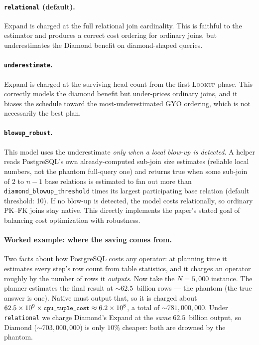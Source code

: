\documentclass[10pt,twocolumn]{article}
\newcommand{\lookup}{\textsc{Lookup}}
\newcommand{\code}[1]{{\small\texttt{#1}}}
\begin{document}
\paragraph{\code{relational} (default).}
Expand is charged at the full relational join cardinality. This is faithful
to the estimator and produces a correct cost ordering for ordinary joins, but
underestimates the Diamond benefit on diamond-shaped queries.

\paragraph{\code{underestimate}.}
Expand is charged at the surviving-head count from the first \lookup{} phase.
This correctly models the diamond benefit but under-prices ordinary joins, and
it biases the schedule toward the most-underestimated GYO ordering, which is
not necessarily the best plan.

\paragraph{\code{blowup\_robust}.}
This model uses the underestimate \emph{only when a local blow-up is
detected}. A helper reads PostgreSQL's own already-computed sub-join size
estimates (reliable local numbers, not the phantom full-query one) and
returns true when some sub-join of
2 to $n{-}1$ base relations is estimated to fan out more than
\code{diamond\_blowup\_threshold} times its largest participating base
relation (default threshold: 10). If no blow-up is detected, the model costs
relationally, so ordinary PK--FK joins stay native. This directly implements
the paper's stated goal of balancing cost optimization with robustness.

\paragraph{Worked example: where the saving comes from.}
Two facts about how PostgreSQL costs any operator: at planning time it estimates
every step's row count from table statistics, and it charges an operator roughly
by the number of rows it \emph{outputs}. Now take the $N=5{,}000$ instance. The
planner estimates the final result at ${\sim}62.5$~billion rows --- the phantom
(the true answer is one). Native must output that, so it is charged about
$62.5\times10^{9}\times\code{cpu\_tuple\_cost}\approx 6.2\times10^{8}$, a total of
${\sim}781{,}000{,}000$. Under \code{relational} we charge Diamond's Expand at
the \emph{same} $62.5$~billion output, so Diamond (${\sim}703{,}000{,}000$) is
only $10\%$ cheaper: both are drowned by the phantom.
\end{document}
